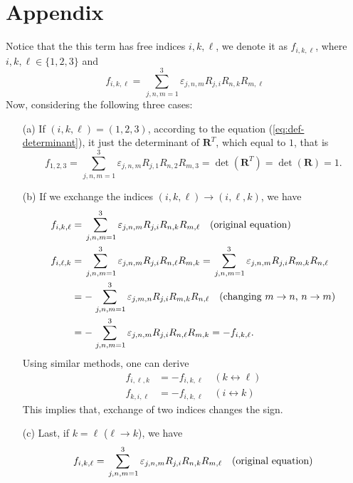 \documentclass[12pt]{article}
\begin{document}
\section{Appendix} \label{app:Levi-Civita-prop}
Notice that the this term has free indices $i,k,\ell$, we denote it as $f_{i,k,\ell}$, where $i,k,\ell \in \{1,2,3\}$ and 
\begin{equation}
f_{i,k,\ell} = \sum_{\,j,n,m=1}^{3}\varepsilon_{j,n,m} R_{j,i} R_{n,k} R_{m,\ell}
\end{equation}
Now, considering the following three cases:
\begin{itemize}
\item[(a)] If $(i,k,\ell) = (1,2,3)$, according to the equation (\ref{eq:def-determinant}), it just the determinant of $\mathbf{R}^{T}$, which equal to $1$, that is 
\begin{equation}
f_{1,2,3} = \sum_{\,j,n,m=1}^{3}\varepsilon_{j,n,m} R_{j,1} R_{n,2} R_{m,3} 
= \det\left(\mathbf{R}^{T}\right) = \det(\mathbf{R}) = 1.
\end{equation}
\item[(b)] If we exchange the indices $(i,k,\ell)\to(i,\ell,k)$, we have
\begin{align}
f_{i,k,\ell} &= \sum_{\,j,n,m=1}^{3}\varepsilon_{j,n,m} R_{j,i} R_{n,k} R_{m,\ell}\quad\text{(original equation)}\notag\\
f_{i,\ell,k} 
&= \sum_{\,j,n,m=1}^{3}\varepsilon_{j,n,m} R_{j,i} R_{n,\ell} R_{m,k}
= \sum_{\,j,n,m=1}^{3}\varepsilon_{j,n,m} R_{j,i} R_{m,k} R_{n,\ell}\\
&= - \sum_{\,j,n,m=1}^{3}\varepsilon_{j,m,n} R_{j,i} R_{m,k} R_{n,\ell}\quad\text{(changing $m\to n$, $n\to m$)}\\
&= - \sum_{\,j,n,m=1}^{3}\varepsilon_{j,n,m} R_{j,i} R_{n,\ell} R_{m,k} = - f_{i,k,\ell}.
\end{align}
Using similar methods, one can derive
\begin{equation}
\begin{aligned}
f_{i,\ell,k} &= - f_{i,k,\ell}\quad (k\leftrightarrow \ell)\\
f_{k,i,\ell} &= - f_{i,k,\ell}\quad (i\leftrightarrow k)
\end{aligned}
\end{equation}
This implies that, exchange of two indices changes the sign.
\item[(c)] Last, if $k=\ell$ ($\ell\to k$), we have
\begin{align}
f_{i,k,\ell} &= \sum_{\,j,n,m=1}^{3}\varepsilon_{j,n,m} R_{j,i} R_{n,k} R_{m,\ell}\quad\text{(original equation)}\notag\\

\end{align}
\end{itemize}
\end{document}
